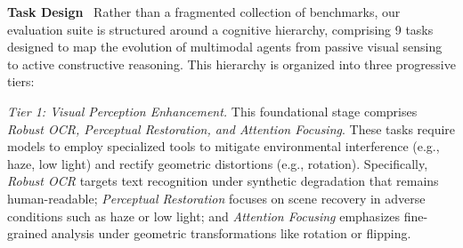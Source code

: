 \documentclass[runningheads]{llncs}
\begin{document}
\noindent \textbf{Task Design}~
Rather than a fragmented collection of benchmarks, our evaluation suite is structured around a cognitive hierarchy, comprising 9 tasks designed to map the evolution of multimodal agents from passive visual sensing to active constructive reasoning. This hierarchy is organized into three progressive tiers:

    \textit{Tier 1: Visual Perception Enhancement.} This foundational stage comprises \textit{Robust OCR, Perceptual Restoration, and Attention Focusing}. These tasks require models to employ specialized tools to mitigate environmental interference (e.g., haze, low light) and rectify geometric distortions (e.g., rotation). Specifically, \textit{Robust OCR} targets text recognition under synthetic degradation that remains human-readable; \textit{Perceptual Restoration} focuses on scene recovery in adverse conditions such as haze or low light; and \textit{Attention Focusing} emphasizes fine-grained analysis under geometric transformations like rotation or flipping.
    
\end{document}
